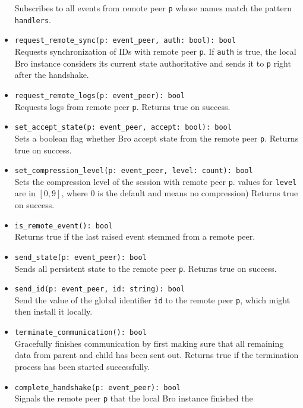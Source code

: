 \documentclass[10pt,landscape]{article}
\newcommand{\ReturnsTrueOnSuccess}{Returns true on success.\xspace}
\begin{document}
\begin{multicols*}{2}
\begin{itemize}
    Subscribes to all events from remote peer \verb|p| whose names match the
    pattern \verb|handlers|.
  \item \verb|request_remote_sync(p: event_peer, auth: bool): bool|\\
    Requests synchronization of IDs with remote peer \verb|p|. If \verb|auth|
    is true, the local Bro instance considers its current state authoritative
    and sends it to \verb|p| right after the handshake.
  \item \verb|request_remote_logs(p: event_peer): bool|\\
    Requests logs from remote peer \verb|p|.
    \ReturnsTrueOnSuccess
  \item \verb|set_accept_state(p: event_peer, accept: bool): bool|\\
    Sets a boolean flag whether Bro accept state from the remote peer \verb|p|.
    \ReturnsTrueOnSuccess
  \item \verb|set_compression_level(p: event_peer, level: count): bool|\\
    Sets the compression level of the session with remote peer \verb|p|.
    values for \verb|level| are in $[0,9]$, where 0 is the default and means no
    compression)
    \ReturnsTrueOnSuccess
  \item \verb|is_remote_event(): bool|\\
    Returns true if the last raised event stemmed from a remote peer.
  \item \verb|send_state(p: event_peer): bool|\\
    Sends all persistent state to the remote peer \verb|p|.
    \ReturnsTrueOnSuccess
  \item \verb|send_id(p: event_peer, id: string): bool|\\
    Send the value of the global identifier \verb|id| to the remote peer
    \verb|p|, which might then install it locally.
  \item \verb|terminate_communication(): bool|\\
    Gracefully finishes communication by first making sure that all remaining
    data from parent and child has been sent out.
    Returns true if the termination process has been started successfully.
  \item \verb|complete_handshake(p: event_peer): bool|\\
    Signals the remote peer \verb|p| that the local Bro instance finished the

\end{itemize}
\end{multicols*}
\end{document}
